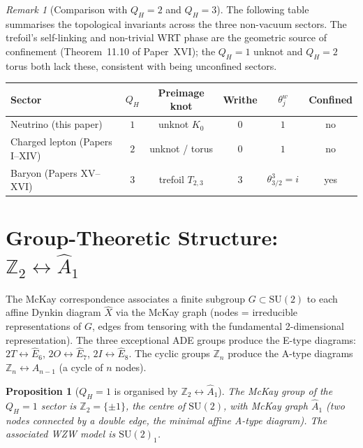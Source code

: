 \documentclass[11pt,a4paper]{article}
\newtheorem{proposition}[theorem]{Proposition}
\theoremstyle{definition}\newtheorem{definition}[theorem]{Definition}
\theoremstyle{remark}
\newtheorem{remark}[theorem]{Remark}
\newcommand{\SU}{\mathrm{SU}}
\newcommand{\twoI}{2I}
\newcommand{\twoT}{2T}
\newcommand{\twoO}{2O}
\newcommand{\QH}{Q_H}
\newcommand{\Ztwo}{\mathbb{Z}_2}
\begin{document}
\begin{remark}[Comparison with $\QH=2$ and $\QH=3$]
\label{P17:rem:comparison_table}
The following table summarises the topological invariants across the
three non-vacuum sectors. The trefoil's self-linking and non-trivial
WRT phase are the geometric source of confinement
(Theorem~11.10 %
of Paper~XVI); the $\QH=1$ unknot and $\QH=2$ torus both lack these,
consistent with being unconfined sectors.
\end{remark}

\begin{center}
\renewcommand{\arraystretch}{1.3}
\begin{tabular}{lccccc}
\toprule
Sector & $\QH$ & Preimage knot & Writhe & $\theta_{j}^w$ & Confined\\
\midrule
Neutrino (this paper) & $1$ & unknot $K_0$ & $0$ & $1$ & no\\
Charged lepton (Papers I--XIV) & $2$ & unknot / torus & $0$ & $1$ & no\\
Baryon (Papers XV--XVI) & $3$ & trefoil $T_{2,3}$ & $3$ & $\theta_{3/2}^3=i$ & yes\\
\bottomrule
\end{tabular}
\end{center}

\section{Group-Theoretic Structure: $\mathbb{Z}_2\leftrightarrow\widehat{A}_1$}
\label{P17:sec:group}

The McKay correspondence associates a finite subgroup $G\subset\SU(2)$
to each affine Dynkin diagram $\widehat{X}$ via the McKay graph
(nodes = irreducible representations of $G$, edges from tensoring with
the fundamental 2-dimensional representation). The three exceptional
ADE groups produce the E-type diagrams:
$\twoT\leftrightarrow\widehat{E}_6$,
$\twoO\leftrightarrow\widehat{E}_7$,
$\twoI\leftrightarrow\widehat{E}_8$.
The cyclic groups $\mathbb{Z}_n$ produce the A-type diagrams
$\mathbb{Z}_n\leftrightarrow\widehat{A}_{n-1}$ (a cycle of $n$ nodes).

\begin{proposition}[$\QH=1$ is organised by $\Ztwo\leftrightarrow\widehat{A}_1$]
\label{P17:prop:qh1_Z2}
The McKay group of the $\QH=1$ sector is $\Ztwo=\{\pm1\}$, the centre
of $\SU(2)$, with McKay graph $\widehat{A}_1$ (two nodes connected by
a double edge, the minimal affine A-type diagram). The associated
WZW model is $\SU(2)_1$.
\end{proposition}
\end{document}
